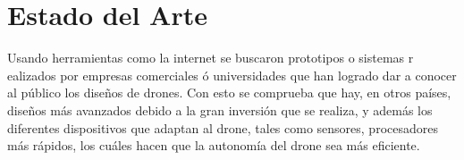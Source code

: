 %
%

\section{Estado del Arte}

Usando herramientas como la internet se buscaron prototipos o sistemas r
ealizados por empresas comerciales ó universidades que han logrado dar a conocer 
al público los diseños de drones. Con esto se comprueba que hay, en otros 
países, diseños más avanzados debido a la gran inversión que se realiza, y 
además los diferentes dispositivos que adaptan al drone, tales como sensores, 
procesadores más rápidos, los cuáles hacen que la autonomía del drone sea más 
eficiente.

